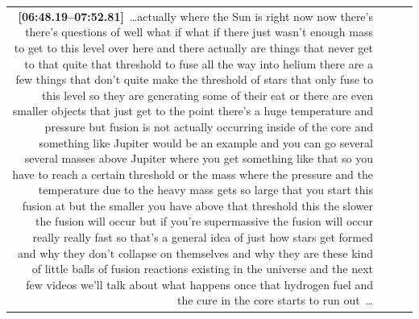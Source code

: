 \documentclass[10pt]{article}
\begin{document}
\begin{tiny}
\begin{longtable}{r p{0.3in} p{1.212in} p{3.8in}}
                                                                                                                                                                                                                                                                                                                                                                                                                                                                                                                                                         \textbf{[06:48.19--07:52.81]}~\ldots actually where the Sun is right now now there's there's questions of well what if what if there just wasn't enough mass to get to this level over here and there actually are things that never get to that quite that threshold to fuse all the way into helium there are a few things that don't quite make the threshold of stars that only fuse to this level so they are generating some of their eat or there are even smaller objects that just get to the point there's a huge temperature and pressure but fusion is not actually occurring inside of the core and something like Jupiter would be an example and you can go several several masses above Jupiter where you get something like that so you have to reach a certain threshold or the mass where the pressure and the temperature due to the heavy mass gets so large that you start this fusion at but the smaller you have above that threshold this the slower the fusion will occur but if you're supermassive the fusion will occur really really fast so that's a general idea of just how stars get formed and why they don't collapse on themselves and why they are these kind of little balls of fusion reactions existing in the universe and the next few videos we'll talk about what happens once that hydrogen fuel and the cure in the core starts to run out~\ldots \\

\end{longtable}
\end{tiny}
\end{document}
